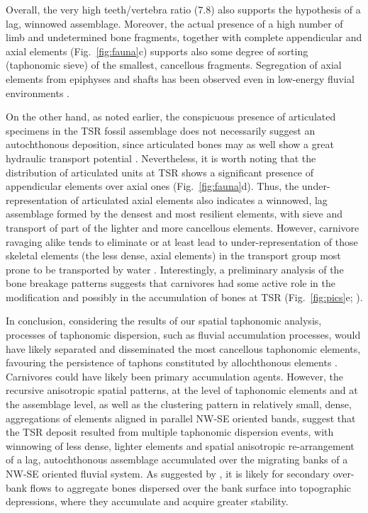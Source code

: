 \documentclass[review,times,authoryear]{elsarticle} %
\begin{document}
Overall, the very high teeth/vertebra ratio (7.8) also supports the hypothesis of a lag, winnowed assemblage. Moreover, the actual presence of a high number of limb and undetermined bone fragments, together with complete appendicular and axial elements (Fig.~\ref{fig:fauna}c) supports also some degree of sorting (taphonomic sieve) of the smallest, cancellous fragments. Segregation of axial elements from epiphyses and shafts has been observed even in low-energy fluvial environments \citep{Dominguez-Rodrigo2017}.

On the other hand, as noted earlier, the conspicuous presence of articulated specimens in the TSR fossil assemblage does not necessarily suggest an autochthonous deposition, since articulated bones may as well show a great hydraulic transport potential \citep{Coard1995,Coard1999}. Nevertheless, it is worth noting that the distribution of articulated units at TSR shows a significant presence of appendicular elements over axial ones (Fig.~\ref{fig:fauna}d). Thus, the under-representation of articulated axial elements also indicates a winnowed, lag assemblage formed by the densest and most resilient elements, with sieve and transport of part of the lighter and more cancellous elements. However, carnivore ravaging alike tends to eliminate or at least lead to under-representation of those skeletal elements (the less dense, axial elements) in the transport group most prone to be transported by water \citep{Voorhies1969,Dominguez-Rodrigo2012}. Interestingly, a preliminary analysis of the bone breakage patterns suggests that carnivores had some active role in the modification and possibly in the accumulation of bones at TSR (Fig.~\ref{fig:pics}e; \citealp{Konidaris2015}).

In conclusion, considering the results of our spatial taphonomic analysis, processes of taphonomic dispersion, such as fluvial accumulation processes, would have likely separated and disseminated the most cancellous taphonomic elements, favouring the persistence of taphons constituted by allochthonous elements \citep{Fernandez-Lopez2006}. Carnivores could have likely been primary accumulation agents. However, the recursive anisotropic spatial patterns, at the level of taphonomic elements and at the assemblage level, as well as the clustering pattern in relatively small, dense, aggregations of elements aligned in parallel NW-SE oriented bands, suggest that the TSR deposit resulted from multiple taphonomic dispersion events, with winnowing of less dense, lighter elements and spatial anisotropic re-arrangement of a lag, autochthonous assemblage accumulated over the migrating banks of a NW-SE oriented fluvial system. As suggested by \cite{Organista2017}, it is likely for secondary over-bank flows to aggregate bones dispersed over the bank surface into topographic depressions, where they accumulate and acquire greater stability.
\end{document}
